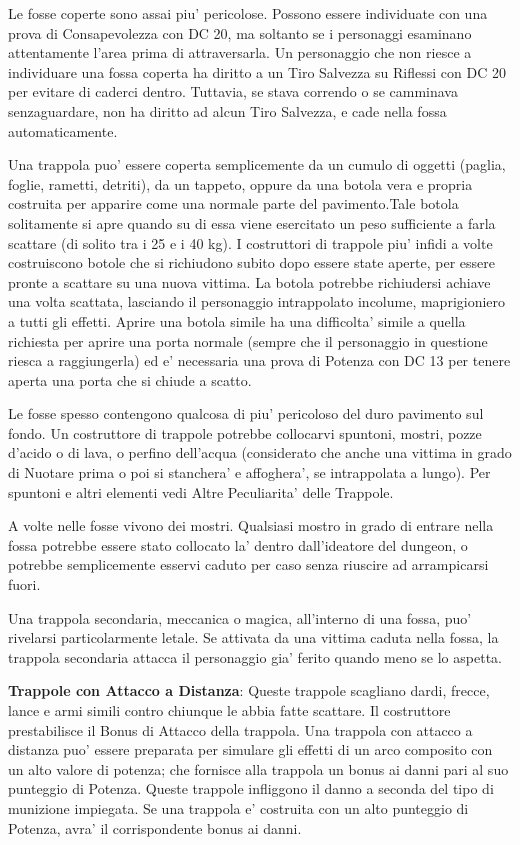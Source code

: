 \documentclass[a4paper,11pt,twoside,openany]{book}
\begin{document}
{		Le fosse coperte sono assai piu' pericolose. Possono essere individuate con una prova di Consapevolezza con DC 20, ma soltanto se i personaggi esaminano attentamente l'area prima di attraversarla. Un personaggio che non riesce a individuare una fossa coperta ha diritto a un Tiro Salvezza su Riflessi con DC 20 per evitare di caderci dentro. Tuttavia, se stava correndo o se camminava senzaguardare, non ha diritto ad alcun Tiro Salvezza, e cade nella fossa automaticamente.
		
		Una trappola puo' essere coperta semplicemente da un cumulo di oggetti (paglia, foglie, rametti, detriti), da un tappeto, oppure da una botola vera e propria costruita per apparire come una normale parte del pavimento.Tale botola solitamente si apre quando su di essa viene esercitato un peso sufficiente a farla scattare (di solito tra i 25 e i 40 kg). I costruttori di trappole piu' infidi a volte costruiscono botole che si richiudono subito dopo essere state aperte, per essere pronte a scattare su una nuova vittima. La botola potrebbe richiudersi achiave una volta scattata, lasciando il personaggio intrappolato incolume, maprigioniero a tutti gli effetti. Aprire una botola simile ha una difficolta' simile a quella richiesta per aprire una porta normale (sempre che il personaggio in questione riesca a raggiungerla) ed e' necessaria una prova di Potenza con DC 13 per tenere aperta una porta che si chiude a scatto.
		
		Le fosse spesso contengono qualcosa di piu' pericoloso del duro pavimento sul fondo. Un costruttore di trappole potrebbe collocarvi spuntoni, mostri, pozze d'acido o di lava, o perfino dell'acqua (considerato che anche una vittima in grado di Nuotare prima o poi si stanchera' e affoghera', se intrappolata a lungo). Per spuntoni e altri elementi vedi Altre Peculiarita' delle Trappole.
		
		A volte nelle fosse vivono dei mostri. Qualsiasi mostro in grado di entrare nella fossa potrebbe essere stato collocato la' dentro dall'ideatore del dungeon, o potrebbe semplicemente esservi caduto per caso senza riuscire ad arrampicarsi fuori.
		
		Una trappola secondaria, meccanica o magica, all'interno di una fossa, puo' rivelarsi particolarmente letale. Se attivata da una vittima caduta nella fossa, la trappola secondaria attacca il personaggio gia' ferito quando meno se lo aspetta.
		
		\textbf{Trappole con Attacco a Distanza}: Queste trappole scagliano dardi, frecce, lance e armi simili contro chiunque le abbia fatte scattare. Il costruttore prestabilisce il Bonus di Attacco della trappola. Una trappola con attacco a distanza puo' essere preparata per simulare gli effetti di un arco composito con un alto valore di potenza; che fornisce alla trappola un bonus ai danni pari al suo punteggio di Potenza. Queste trappole infliggono il danno a seconda del tipo di munizione impiegata. Se una trappola e' costruita con un alto punteggio di Potenza, avra' il corrispondente bonus ai danni.
		
}
\end{document}
